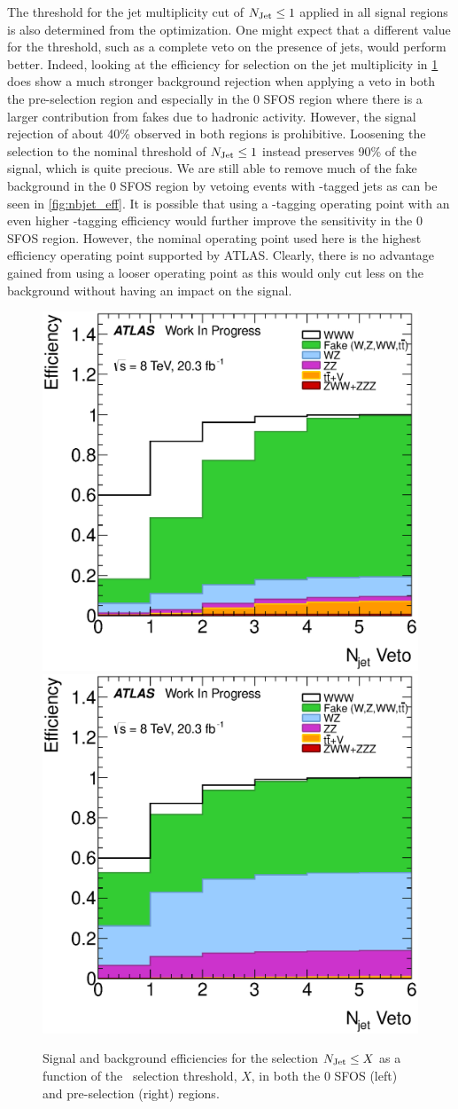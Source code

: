 The threshold for the jet multiplicity cut 
of $N_{\textrm{Jet}}\leq 1$ applied in all signal regions
is also determined from the optimization. One might expect
that a different value for the threshold, such as a complete
veto on the presence of jets, would perform better. 
Indeed, looking at the efficiency for selection on the jet multiplicity
in \fig\ref{fig:njet_eff} does show a much stronger background
rejection when applying a veto in both the pre-selection region
and especially in the 0 SFOS region where there is a larger
contribution from fakes due to hadronic activity.
However, the signal rejection of about 40\% observed in both
regions is prohibitive. Loosening the selection to the nominal
threshold of $N_{\textrm{Jet}} \leq 1$ instead preserves 90\% of the signal, 
which is quite precious.  We are still able to remove 
much of the fake background in the 0 SFOS region by vetoing
events with \bee-tagged jets as can be seen in \fig\ref{fig:nbjet_eff}.
It is possible that using a \bee-tagging operating point
with an even higher \bee-tagging efficiency would further 
improve the sensitivity in the 0 SFOS region.  However,
the nominal operating point used here is the highest 
efficiency operating point supported by ATLAS.
Clearly, there is no advantage gained from using a looser operating point
as this would only cut less on the background without having an impact
on the signal.



\begin{figure}[ht!]
\centering
\includegraphics[width=0.45\columnwidth]{figures/optimization/SignalRegionsPreselection_0SFOS_Efficiencies/NJets_LeftCumulative.eps}
\includegraphics[width=0.45\columnwidth]{figures/optimization/SignalRegions_0p5mmZ0_Preselection_Efficiencies/NJets_LeftCumulative.eps}
\caption{ Signal and background efficiencies for the selection
$N_{\textrm{Jet}} \leq X$ as a function of the \njet~selection
threshold, $X$, in both the 0 SFOS (left) and pre-selection (right) regions.  }
\label{fig:njet_eff}
\end{figure}

